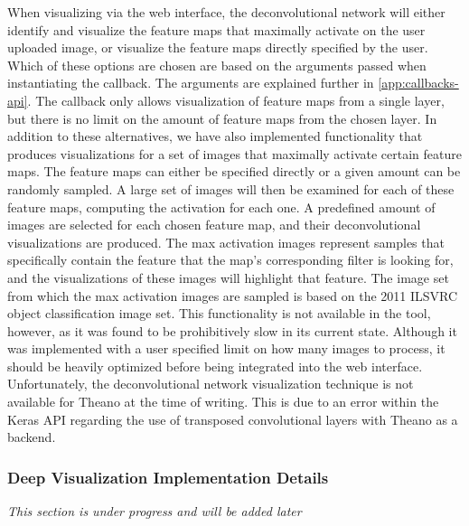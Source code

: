 \noindent When visualizing via the web interface, the deconvolutional network will either identify and visualize the feature maps that maximally activate on the user uploaded image, or visualize the feature maps directly specified by the user. Which of these options are chosen are based on the arguments passed when instantiating the callback. The arguments are explained further in \autoref{app:callbacks-api}. The callback only allows visualization of feature maps from a single layer, but there is no limit on the amount of feature maps from the chosen layer. In addition to these alternatives, we have also implemented functionality that produces visualizations for a set of images that maximally activate certain feature maps. The feature maps can either be specified directly or a given amount can be randomly sampled. A large set of images will then be examined for each of these feature maps, computing the activation for each one. A predefined amount of images are selected for each chosen feature map, and their deconvolutional visualizations are produced. The max activation images represent samples that specifically contain the feature that the map's corresponding filter is looking for, and the visualizations of these images will highlight that feature. The image set from which the max activation images are sampled is based on the 2011 ILSVRC object classification image set. This functionality is not available in the tool, however, as it was found to be prohibitively slow in its current state. Although it was implemented with a user specified limit on how many images to process, it should be heavily optimized before being integrated into the web interface. \\

\noindent Unfortunately, the deconvolutional network visualization technique is not available for Theano at the time of writing. This is due to an error within the Keras API regarding the use of transposed convolutional layers with Theano as a backend.

\subsubsection{Deep Visualization Implementation Details}

\textit{This section is under progress and will be added later}

